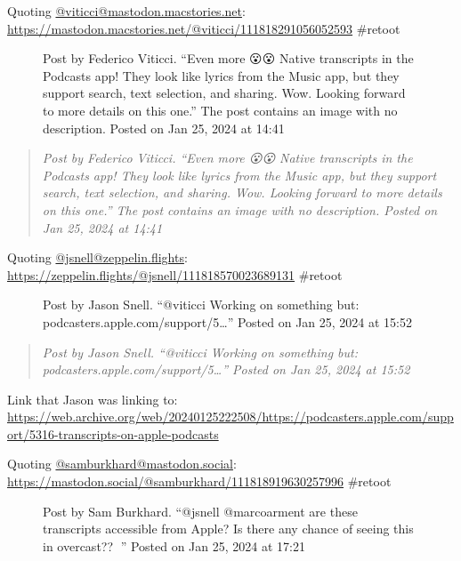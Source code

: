 Quoting
\href{https://mastodon.macstories.net/}{@viticci@mastodon.macstories.net}:
\url{https://mastodon.macstories.net/@viticci/111818291056052593}
\#retoot

\begin{figure}
\centering
{}
\caption{Post by Federico Viticci. ``Even more 😮😮 Native transcripts
in the Podcasts app! They look like lyrics from the Music app, but they
support search, text selection, and sharing. Wow. Looking forward to
more details on this one.'' The post contains an image with no
description. Posted on Jan 25, 2024 at 14:41}
\end{figure}

\begin{quote}
\emph{Post by Federico Viticci. ``Even more 😮😮 Native transcripts in
the Podcasts app! They look like lyrics from the Music app, but they
support search, text selection, and sharing. Wow. Looking forward to
more details on this one.'' The post contains an image with no
description. Posted on Jan 25, 2024 at 14:41}
\end{quote}

Quoting
\href{https://zeppelin.flights/@jsnell/}{@jsnell@zeppelin.flights}:
\url{https://zeppelin.flights/@jsnell/111818570023689131} \#retoot

\begin{figure}
\centering
{}
\caption{Post by Jason Snell. ``@viticci Working on something but:
podcasters.apple.com/support/5\ldots{}'' Posted on Jan 25, 2024 at
15:52}
\end{figure}

\begin{quote}
\emph{Post by Jason Snell. ``@viticci Working on something but:
podcasters.apple.com/support/5\ldots{}'' Posted on Jan 25, 2024 at
15:52}
\end{quote}

Link that Jason was linking to:
\url{https://web.archive.org/web/20240125222508/https://podcasters.apple.com/support/5316-transcripts-on-apple-podcasts}

Quoting
\href{https://mastodon.social/@samburkhard/}{@samburkhard@mastodon.social}:
\url{https://mastodon.social/@samburkhard/111818919630257996} \#retoot

\begin{figure}
\centering
{}
\caption{Post by Sam Burkhard. ``@jsnell @marcoarment are these
transcripts accessible from Apple? Is there any chance of seeing this in
overcast?? 👀'' Posted on Jan 25, 2024 at 17:21}
\end{figure}


